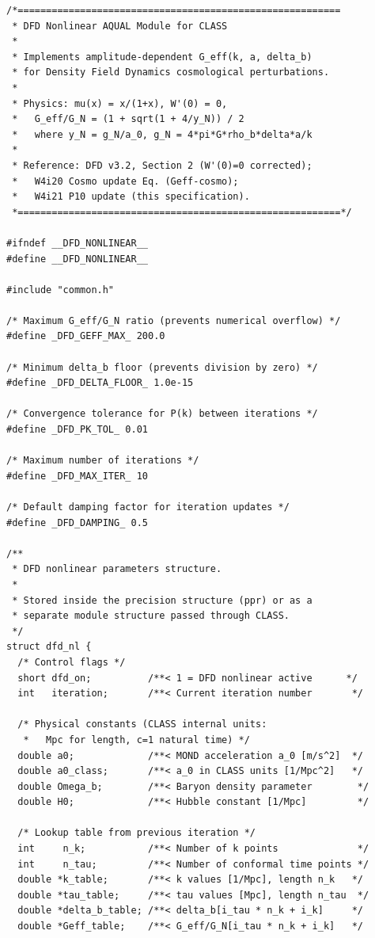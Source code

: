 \documentclass[11pt]{article}
\theoremstyle{definition}
\theoremstyle{remark}
\begin{document}
\begin{lstlisting}[caption={dfd\_nonlinear.h --- Complete header},label={lst:header}]
/*=========================================================
 * DFD Nonlinear AQUAL Module for CLASS
 *
 * Implements amplitude-dependent G_eff(k, a, delta_b)
 * for Density Field Dynamics cosmological perturbations.
 *
 * Physics: mu(x) = x/(1+x), W'(0) = 0,
 *   G_eff/G_N = (1 + sqrt(1 + 4/y_N)) / 2
 *   where y_N = g_N/a_0, g_N = 4*pi*G*rho_b*delta*a/k
 *
 * Reference: DFD v3.2, Section 2 (W'(0)=0 corrected);
 *   W4i20 Cosmo update Eq. (Geff-cosmo);
 *   W4i21 P10 update (this specification).
 *=========================================================*/

#ifndef __DFD_NONLINEAR__
#define __DFD_NONLINEAR__

#include "common.h"

/* Maximum G_eff/G_N ratio (prevents numerical overflow) */
#define _DFD_GEFF_MAX_ 200.0

/* Minimum delta_b floor (prevents division by zero) */
#define _DFD_DELTA_FLOOR_ 1.0e-15

/* Convergence tolerance for P(k) between iterations */
#define _DFD_PK_TOL_ 0.01

/* Maximum number of iterations */
#define _DFD_MAX_ITER_ 10

/* Default damping factor for iteration updates */
#define _DFD_DAMPING_ 0.5

/**
 * DFD nonlinear parameters structure.
 *
 * Stored inside the precision structure (ppr) or as a
 * separate module structure passed through CLASS.
 */
struct dfd_nl {
  /* Control flags */
  short dfd_on;          /**< 1 = DFD nonlinear active      */
  int   iteration;       /**< Current iteration number       */

  /* Physical constants (CLASS internal units:
   *   Mpc for length, c=1 natural time) */
  double a0;             /**< MOND acceleration a_0 [m/s^2]  */
  double a0_class;       /**< a_0 in CLASS units [1/Mpc^2]   */
  double Omega_b;        /**< Baryon density parameter        */
  double H0;             /**< Hubble constant [1/Mpc]         */

  /* Lookup table from previous iteration */
  int     n_k;           /**< Number of k points              */
  int     n_tau;         /**< Number of conformal time points */
  double *k_table;       /**< k values [1/Mpc], length n_k   */
  double *tau_table;     /**< tau values [Mpc], length n_tau  */
  double *delta_b_table; /**< delta_b[i_tau * n_k + i_k]     */
  double *Geff_table;    /**< G_eff/G_N[i_tau * n_k + i_k]   */


\end{lstlisting}
\end{document}

